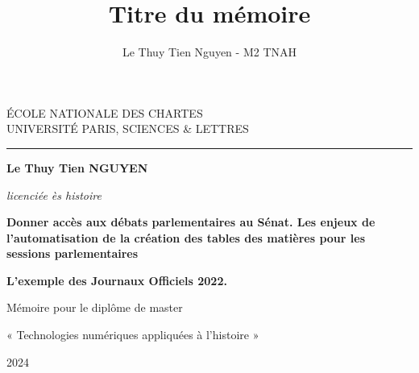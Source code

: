 \author{Le Thuy Tien Nguyen - M2 TNAH}
\title{Titre du mémoire}



%

\begin{titlepage} 

\centering 

{\LARGE ÉCOLE NATIONALE DES CHARTES\\
UNIVERSITÉ PARIS, SCIENCES \& LETTRES \par} 

\vspace{1cm} %
\rule{2cm}{0.02cm}

\vspace{3cm} 

{\Large \textbf{Le Thuy Tien NGUYEN} \par}

\normalsize \textit{licenciée ès histoire} \par

\vspace{2cm} 

{\Huge \textbf{Donner accès aux débats parlementaires au Sénat. Les enjeux de l’automatisation de la création des tables des matières pour les sessions parlementaires } \par}

\vspace{1cm}

{\LARGE \textbf{L’exemple des Journaux Officiels 2022.} \par}

\vfill

{\large Mémoire pour le diplôme de master \par}
{\large « Technologies numériques appliquées à l'histoire » \par} 

\vspace{0.5cm}

{2024 \par} 

\end{titlepage}